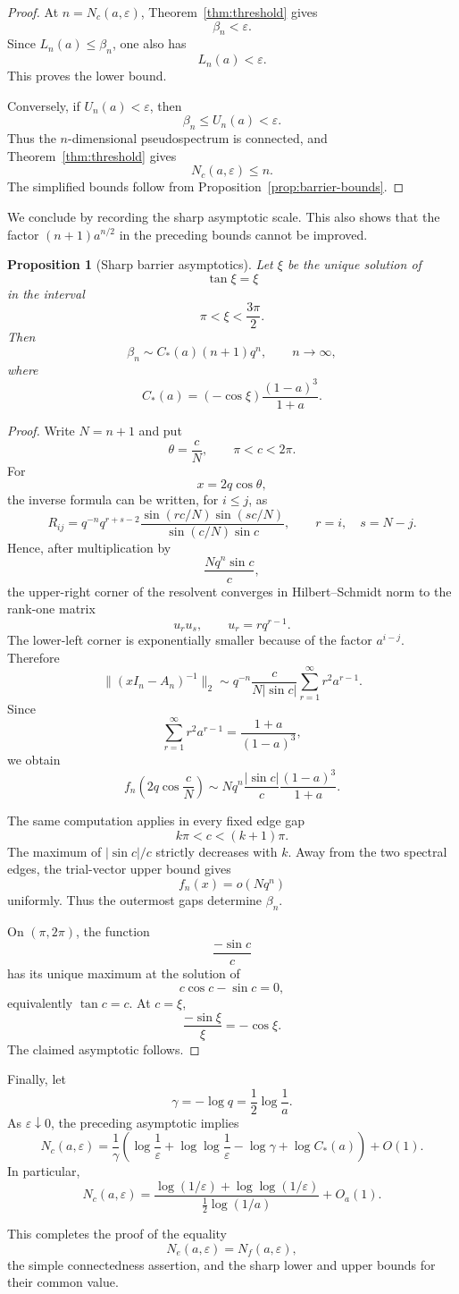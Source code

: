 \documentclass[11pt]{article}
\newtheorem{proposition}[theorem]{Proposition}
\begin{document}
\begin{proof}
At \(n=N_c(a,\varepsilon)\), Theorem~\ref{thm:threshold} gives
\[
\beta_n<\varepsilon.
\]
Since \(L_n(a)\le\beta_n\), one also has
\[
L_n(a)<\varepsilon.
\]
This proves the lower bound.

Conversely, if \(U_n(a)<\varepsilon\), then
\[
\beta_n\le U_n(a)<\varepsilon.
\]
Thus the \(n\)-dimensional pseudospectrum is connected, and
Theorem~\ref{thm:threshold} gives
\[
N_c(a,\varepsilon)\le n.
\]
The simplified bounds follow from Proposition~\ref{prop:barrier-bounds}.
\end{proof}

We conclude by recording the sharp asymptotic scale. This also shows
that the factor \((n+1)a^{n/2}\) in the preceding bounds cannot be
improved.

\begin{proposition}[Sharp barrier asymptotics]
Let \(\xi\) be the unique solution of
\[
\tan\xi=\xi
\]
in the interval
\[
\pi<\xi<\frac{3\pi}{2}.
\]
Then
\[
\beta_n
\sim
C_*(a)(n+1)q^n,
\qquad
n\to\infty,
\]
where
\[
C_*(a)
=
(-\cos\xi)\frac{(1-a)^3}{1+a}.
\]
\end{proposition}

\begin{proof}
Write \(N=n+1\) and put
\[
\theta=\frac{c}{N},
\qquad
\pi<c<2\pi.
\]
For
\[
x=2q\cos\theta,
\]
the inverse formula can be written, for \(i\le j\), as
\[
R_{ij}
=
q^{-n}q^{r+s-2}
\frac{
\sin(rc/N)\sin(sc/N)
}{
\sin(c/N)\sin c
},
\qquad
r=i,\quad s=N-j.
\]
Hence, after multiplication by
\[
\frac{Nq^n\sin c}{c},
\]
the upper-right corner of the resolvent converges in Hilbert--Schmidt
norm to the rank-one matrix
\[
u_ru_s,
\qquad
u_r=rq^{r-1}.
\]
The lower-left corner is exponentially smaller because of the factor
\(a^{i-j}\). Therefore
\[
\|(xI_n-A_n)^{-1}\|_2
\sim
q^{-n}\frac{c}{N|\sin c|}
\sum_{r=1}^{\infty}r^2a^{r-1}.
\]
Since
\[
\sum_{r=1}^{\infty}r^2a^{r-1}
=
\frac{1+a}{(1-a)^3},
\]
we obtain
\[
f_n\!\left(2q\cos\frac{c}{N}\right)
\sim
Nq^n
\frac{|\sin c|}{c}
\frac{(1-a)^3}{1+a}.
\]

The same computation applies in every fixed edge gap
\[
k\pi<c<(k+1)\pi.
\]
The maximum of \(|\sin c|/c\) strictly decreases with \(k\). Away from
the two spectral edges, the trial-vector upper bound gives
\[
f_n(x)=o(Nq^n)
\]
uniformly. Thus the outermost gaps determine \(\beta_n\).

On \((\pi,2\pi)\), the function
\[
\frac{-\sin c}{c}
\]
has its unique maximum at the solution of
\[
c\cos c-\sin c=0,
\]
equivalently \(\tan c=c\). At \(c=\xi\),
\[
\frac{-\sin\xi}{\xi}=-\cos\xi.
\]
The claimed asymptotic follows.
\end{proof}

Finally, let
\[
\gamma=-\log q=\frac12\log\frac1a.
\]
As \(\varepsilon\downarrow0\), the preceding asymptotic implies
\[
\boxed{
N_c(a,\varepsilon)
=
\frac1\gamma
\left(
\log\frac1\varepsilon
+
\log\log\frac1\varepsilon
-
\log\gamma
+
\log C_*(a)
\right)
+O(1).
}
\]
In particular,
\[
N_c(a,\varepsilon)
=
\frac{
\log(1/\varepsilon)+\log\log(1/\varepsilon)
}{
\frac12\log(1/a)
}
+O_a(1).
\]

This completes the proof of the equality
\[
N_e(a,\varepsilon)=N_f(a,\varepsilon),
\]
the simple connectedness assertion, and the sharp lower and upper
bounds for their common value.
\end{document}
